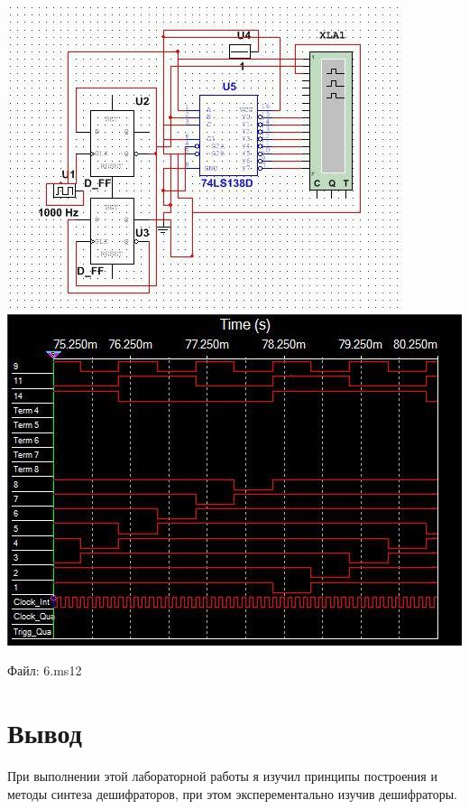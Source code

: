 \documentclass[a4paper,12pt]{article}
\begin{document}
\begin{center}
	\includegraphics[scale=1]{../screens/5_1.jpg} \newline\newline
	\includegraphics[scale=1]{../screens/5_2.jpg} \newline
\end{center}

\noindent Файл: 6.ms12

\section{Вывод}

\noindent При выполнении этой лабораторной работы я изучил принципы построения и методы синтеза дешифраторов, при этом эксперементально изучив дешифраторы.
\end{document}
